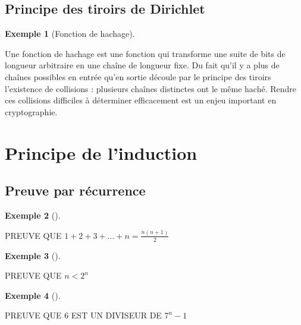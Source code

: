 \documentclass[
  letterpaper,
]{scrbook}
\theoremstyle{plain}
\theoremstyle{definition}
\newtheorem{example}{Exemple}[chapter]
\theoremstyle{definition}
\theoremstyle{remark}
\begin{document}
\hypertarget{principe-des-tiroirs-de-dirichlet}{%
\subsection{Principe des tiroirs de
Dirichlet}\label{principe-des-tiroirs-de-dirichlet}}

\leavevmode{}%
\begin{example}[Fonction de hachage]\label{exm-fonction-hachage}

Une fonction de hachage est une fonction qui transforme une suite de
bits de longueur arbitraire en une chaîne de longueur fixe. Du fait
qu'il y a plus de chaînes possibles en entrée qu'en sortie découle par
le principe des tiroirs l'existence de collisions : plusieurs chaînes
distinctes ont le même haché. Rendre ces collisions difficiles à
déterminer efficacement est un enjeu important en cryptographie.

\end{example}

\hypertarget{principe-de-linduction}{%
\section{Principe de l'induction}\label{principe-de-linduction}}

\hypertarget{preuve-par-ruxe9currence}{%
\subsection{Preuve par récurrence}\label{preuve-par-ruxe9currence}}

\leavevmode{}%
\begin{example}[]\label{exm-somme-n-premiers-entiers}

PREUVE QUE \(1+2+3+\ldots +n=\frac{n(n+1)}{2}\)

\end{example}

\leavevmode{}%
\begin{example}[]\label{exm-n-plus-petit-2n}

PREUVE QUE \(n<2^n\)

\end{example}

\leavevmode{}%
\begin{example}[]\label{exm-6-divise-7n-1}

PREUVE QUE 6 EST UN DIVISEUR DE \(7^n-1\)

\end{example}
\end{document}

